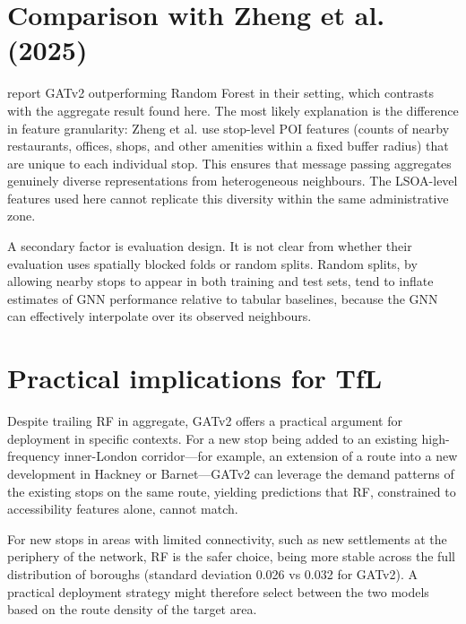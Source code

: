 \documentclass[12pt,a4paper]{report}
\begin{document}
\section{Comparison with Zheng et al. (2025)}
\citet{zheng2025mfstgat} report GATv2 outperforming Random Forest in their
setting, which contrasts with the aggregate result found here. The most
likely explanation is the difference in feature granularity: Zheng et al.
use stop-level POI features (counts of nearby restaurants, offices, shops,
and other amenities within a fixed buffer radius) that are unique to each
individual stop. This ensures that message passing aggregates genuinely
diverse representations from heterogeneous neighbours. The LSOA-level
features used here cannot replicate this diversity within the same
administrative zone.

A secondary factor is evaluation design. It is not clear from \citet{zheng2025mfstgat}
whether their evaluation uses spatially blocked folds or random splits.
Random splits, by allowing nearby stops to appear in both training and test
sets, tend to inflate estimates of GNN performance relative to tabular
baselines, because the GNN can effectively interpolate over its observed
neighbours.

\section{Practical implications for TfL}
Despite trailing RF in aggregate, GATv2 offers a practical argument for
deployment in specific contexts. For a new stop being added to an existing
high-frequency inner-London corridor---for example, an extension of a route
into a new development in Hackney or Barnet---GATv2 can leverage the demand
patterns of the existing stops on the same route, yielding predictions that
RF, constrained to accessibility features alone, cannot match.

For new stops in areas with limited connectivity, such as new settlements
at the periphery of the network, RF is the safer choice, being more stable
across the full distribution of boroughs (standard deviation 0.026 vs 0.032
for GATv2). A practical deployment strategy might therefore select between
the two models based on the route density of the target area.
\end{document}
